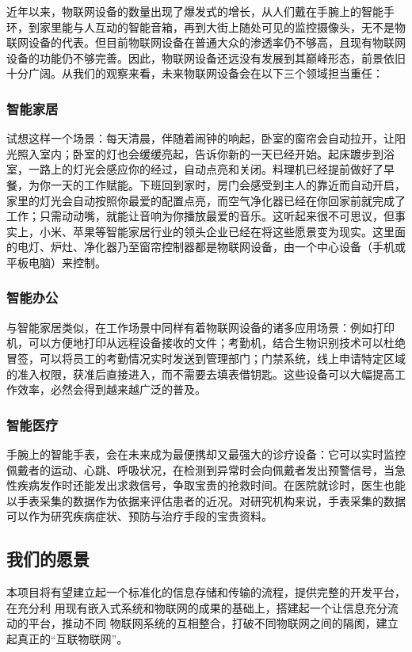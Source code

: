 \documentclass{ctexart}
\begin{document}
近年以来，物联网设备的数量出现了爆发式的增长，从人们戴在手腕上的智能手环，到家里能与人互动的智能音箱，再到大街上随处可见的监控摄像头，无不是物联网设备的代表。但目前物联网设备在普通大众的渗透率仍不够高，且现有物联网设备的功能仍不够完善。因此，物联网设备还远没有发展到其巅峰形态，前景依旧十分广阔。从我们的观察来看，未来物联网设备会在以下三个领域担当重任：

\subsubsection{智能家居}

试想这样一个场景：每天清晨，伴随着闹钟的响起，卧室的窗帘会自动拉开，让阳光照入室内；卧室的灯也会缓缓亮起，告诉你新的一天已经开始。起床踱步到浴室，一路上的灯光会感应你的经过，自动点亮和关闭。料理机已经提前做好了早餐，为你一天的工作赋能。下班回到家时，房门会感受到主人的靠近而自动开启，家里的灯光会自动按照你最爱的配置点亮，而空气净化器已经在你回家前就完成了工作；只需动动嘴，就能让音响为你播放最爱的音乐。这听起来很不可思议，但事实上，小米、苹果等智能家居行业的领头企业已经在将这些愿景变为现实。这里面的电灯、炉灶、净化器乃至窗帘控制器都是物联网设备，由一个中心设备（手机或平板电脑）来控制。

\subsubsection{智能办公}

与智能家居类似，在工作场景中同样有着物联网设备的诸多应用场景：例如打印机，可以方便地打印从远程设备接收的文件；考勤机，结合生物识别技术可以杜绝冒签，可以将员工的考勤情况实时发送到管理部门；门禁系统，线上申请特定区域的准入权限，获准后直接进入，而不需要去填表借钥匙。这些设备可以大幅提高工作效率，必然会得到越来越广泛的普及。

\subsubsection{智能医疗}

手腕上的智能手表，会在未来成为最便携却又最强大的诊疗设备：它可以实时监控佩戴者的运动、心跳、呼吸状况，在检测到异常时会向佩戴者发出预警信号，当急性疾病发作时还能发出求救信号，争取宝贵的抢救时间。在医院就诊时，医生也能以手表采集的数据作为依据来评估患者的近况。对研究机构来说，手表采集的数据可以作为研究疾病症状、预防与治疗手段的宝贵资料。

\subsection{我们的愿景}
本项目将有望建立起一个标准化的信息存储和传输的流程，提供完整的开发平台，在充分利
用现有嵌入式系统和物联网的成果的基础上，搭建起一个让信息充分流动的平台，推动不同
物联网系统的互相整合，打破不同物联网之间的隔阂，建立起真正的“互联物联网”。
\end{document}
